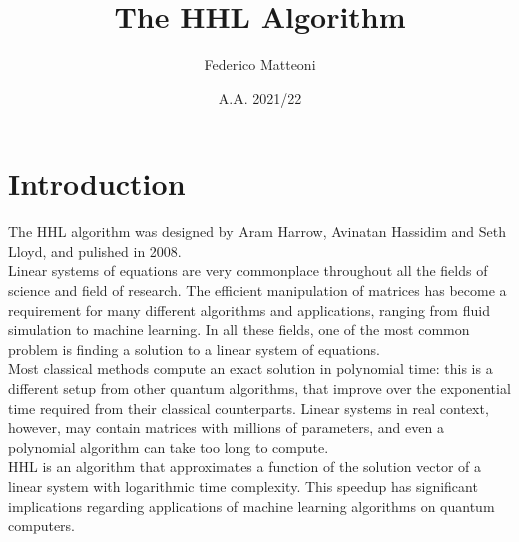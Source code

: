 \documentclass[10pt]{article}
\begin{document}
\title{The HHL Algorithm}
\author{Federico Matteoni}
\date{A.A. 2021/22}
\maketitle
\section{Introduction}
The HHL algorithm was designed by Aram Harrow, Avinatan Hassidim and Seth Lloyd, and pulished in 2008.\\
Linear systems of equations are very commonplace throughout all the fields of science and field of research. The efficient manipulation of matrices has become a requirement for many different algorithms and applications, ranging from fluid simulation to machine learning. In all these fields, one of the most common problem is finding a solution to a linear system of equations.\\
Most classical methods compute an exact solution in polynomial time: this is a different setup from other quantum algorithms, that improve over the exponential time required from their classical counterparts. Linear systems in real context, however, may contain matrices with millions of parameters, and even a polynomial algorithm can take too long to compute.\\
HHL is an algorithm that approximates a function of the solution vector of a linear system with logarithmic time complexity. This speedup has significant implications regarding applications of machine learning algorithms on quantum computers.
\end{document}
